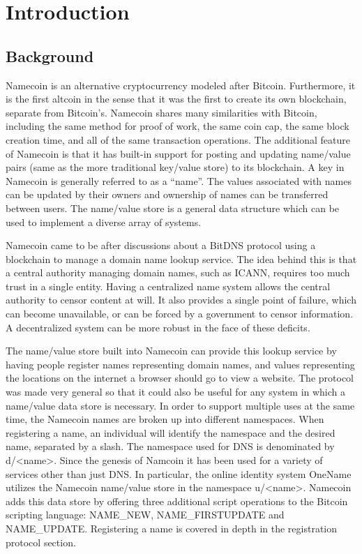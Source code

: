 \section{Introduction}
\label{sec:intro}

\subsection{Background}

Namecoin is an alternative cryptocurrency modeled after Bitcoin\cite{nakamoto2008bitcoin}. Furthermore, it is the first altcoin in the sense that it was the first to create its own blockchain, separate from Bitcoin's. Namecoin shares many similarities with Bitcoin, including the same method for proof of work, the same coin cap, the same block creation time, and all of the same transaction operations. The additional feature of Namecoin is that it has built-in support for posting and updating name/value pairs (same as the more traditional key/value store) to its blockchain. A key in Namecoin is generally referred to as a ``name''. The values associated with names can be updated by their owners and ownership of names can be transferred between users. The name/value store is a general data structure which can be used to implement a diverse array of systems.

Namecoin came to be after discussions about a BitDNS\cite{bitdns} protocol using a blockchain to manage a domain name lookup service. The idea behind this is that a central authority managing domain names, such as ICANN, requires too much trust in a single entity. Having a centralized name system allows the central authority to censor content at will. It also provides a single point of failure, which can become unavailable, or can be forced by a government to censor information. A decentralized system can be more robust in the face of these deficits.

The name/value store built into Namecoin can provide this lookup service by having people register names representing domain names, and values representing the locations on the internet a browser should go to view a website. The protocol was made very general so that it could also be useful for any system in which a name/value data store is necessary. In order to support multiple uses at the same time, the Namecoin names are broken up into different namespaces. When registering a name, an individual will identify the namespace and the desired name, separated by a slash. The namespace used for DNS is denominated by d/<name>. Since the genesis of Namcoin it has been used for a variety of services other than just DNS. In particular, the online identity system OneName utilizes the Namecoin name/value store in the namespace u/<name>. Namecoin adds this data store by offering three additional script operations to the Bitcoin scripting language: NAME\_NEW, NAME\_FIRSTUPDATE and NAME\_UPDATE. Registering a name is covered in depth in the registration protocol section. 

